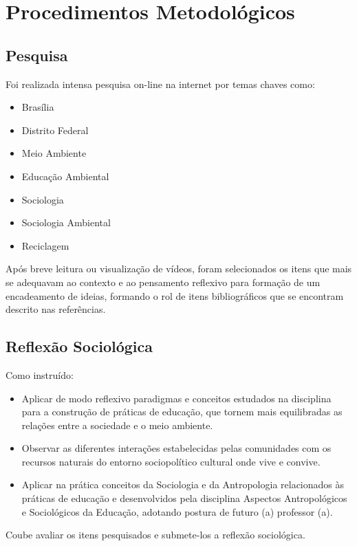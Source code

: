 \chapter{Procedimentos Metodológicos}

\section{Pesquisa}

Foi realizada intensa pesquisa on-line na internet por temas chaves como:
\begin{itemize}
    \item Brasília
    \item Distrito Federal
    \item Meio Ambiente
    \item Educação Ambiental
    \item Sociologia
    \item Sociologia Ambiental
    \item Reciclagem
\end{itemize}

Após breve leitura ou visualização de vídeos, foram selecionados os itens que mais se adequavam ao contexto e ao pensamento reflexivo para formação de um encadeamento de ideias, formando o rol de itens bibliográficos que se encontram descrito nas referências.

\section{Reflexão Sociológica}

Como instruído:
\begin{itemize}
    \item Aplicar de modo reflexivo paradigmas e conceitos estudados na disciplina para a construção de práticas de educação, que tornem mais equilibradas as relações entre a sociedade e o meio ambiente.
    \item Observar as diferentes interações estabelecidas pelas comunidades com os recursos naturais do entorno sociopolítico cultural onde vive e convive.
    \item Aplicar na prática conceitos da Sociologia e da Antropologia relacionados às práticas de educação e desenvolvidos pela disciplina Aspectos Antropológicos e Sociológicos da Educação, adotando postura de futuro (a) professor (a).
\end{itemize}

Coube avaliar os itens pesquisados e submete-los a reflexão sociológica.